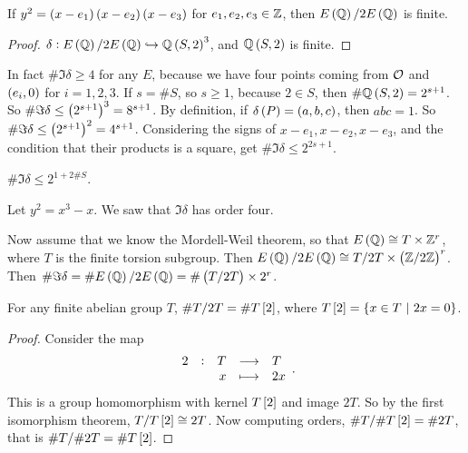 \begin{theorem}
If $ y^2 = \br{x - e_1}\br{x - e_2}\br{x - e_3} $ for $ e_1, e_2, e_3 \in \mathbb{Z} $, then $ E\br{\QQ} / 2E\br{\QQ} $ is finite.
\end{theorem}

\begin{proof}
$ \delta : E\br{\QQ} / 2E\br{\QQ} \hookrightarrow \QQ\br{S, 2}^3 $, and $ \QQ\br{S, 2} $ is finite.
\end{proof}

In fact $ \#\Im \delta \ge 4 $ for any $ E $, because we have four points coming from $ \mathcal{O} $ and $ \br{e_i, 0} $ for $ i = 1, 2, 3 $. If $ s = \#S $, so $ s \ge 1 $, because $ 2 \in S $, then $ \#\QQ\br{S, 2} = 2^{s + 1} $. So $ \#\Im \delta \le \br{2^{s + 1}}^3 = 8^{s + 1} $. By definition, if $ \delta\br{P} = \br{a, b, c} $, then $ abc = 1 $. So $ \#\Im \delta \le \br{2^{s + 1}}^2 = 4^{s + 1} $. Considering the signs of $ x - e_1, x - e_2, x - e_3 $, and the condition that their products is a square, get $ \#\Im \delta \le 2^{2s + 1} $.

\begin{corollary}
$ \#\Im \delta \le 2^{1 + 2\#S} $.
\end{corollary}

\begin{example}
Let $ y^2 = x^3 - x $. We saw that $ \Im \delta $ has order four.
\end{example}

\pagebreak

Now assume that we know the Mordell-Weil theorem, so that $ E\br{\QQ} \cong T \times \ZZ^r $, where $ T $ is the finite torsion subgroup. Then $ E\br{\QQ} / 2E\br{\QQ} \cong T / 2T \times \br{\ZZ / 2\ZZ}^r $. Then $ \#\Im \delta = \#E\br{\QQ} / 2E\br{\QQ} = \#\br{T / 2T} \times 2^r $.

\begin{lemma}
For any finite abelian group $ T $, $ \#T / 2T = \#T\sbr{2} $, where $ T\sbr{2} = \cbr{x \in T \st 2x = 0} $.
\end{lemma}

\begin{proof}
Consider the map
$$ \function[2]{T}{T}{x}{2x}. $$
This is a group homomorphism with kernel $ T\sbr{2} $ and image $ 2T $. So by the first isomorphism theorem, $ T / T\sbr{2} \cong 2T $. Now computing orders, $ \#T / \#T\sbr{2} = \#2T $, that is $ \#T / \#2T = \#T\sbr{2} $.
\end{proof}

